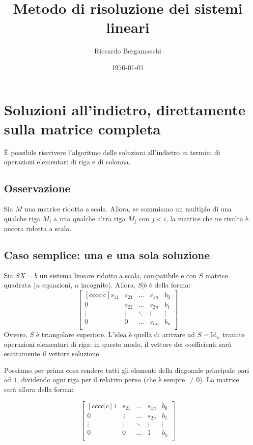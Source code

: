 \documentclass{article}
\title{Metodo di risoluzione dei sistemi lineari}
\author{Riccardo Bergamaschi}
\date{\today}
\begin{document}
\maketitle
\section*{Soluzioni all'indietro, direttamente sulla matrice completa}

È possibile riscrivere l'algoritmo delle soluzioni all'indietro
in termini di operazioni elementari di riga e di colonna.

\subsection*{Osservazione}
Sia $M$ una matrice ridotta a scala.
Allora, se sommiamo un multiplo di una qualche riga $M_i$
a una qualche altra riga $M_j$ con $j<i$, la matrice che ne
risulta è ancora ridotta a scala.

\subsection*{Caso semplice: una e una sola soluzione}
Sia $SX=b$ un sistema lineare ridotto a scala,
compatibile e con $S$ matrice quadrata ($n$ equazioni, $n$ incognite).
Allora, $S|b$ è della forma:
\[\begin{bmatrix}[cccc|c]
    s_{11} & s_{21} & \dots & s_{1n} & b_0 \\
    0      & s_{22} & \dots & s_{2n} & b_1 \\
    \vdots & \vdots & \ddots & \vdots & \vdots \\
    0      & 0      & \dots & s_{nn} & b_n \\
\end{bmatrix}\]
Ovvero, $S$ è triangolare superiore.
L'idea è quella di arrivare ad $S = \text{Id}_n$ tramite operazioni
elementari di riga: in questo modo, il vettore dei coefficienti sarà
esattamente il vettore soluzione.

Possiamo per prima cosa rendere tutti gli elementi della diagonale
principale pari ad $1$, dividendo ogni riga per il relativo perno
(che è sempre $\ne 0$). La matrice sarà allora della forma:

\[\begin{bmatrix}[cccc|c]
    1      & s_{21} & \dots & s_{1n} & b_0 \\
    0      & 1      & \dots & s_{2n} & b_1 \\
    \vdots & \vdots & \ddots & \vdots & \vdots \\
    0      & 0      & \dots & 1      & b_n \\
\end{bmatrix}\]
\end{document}
